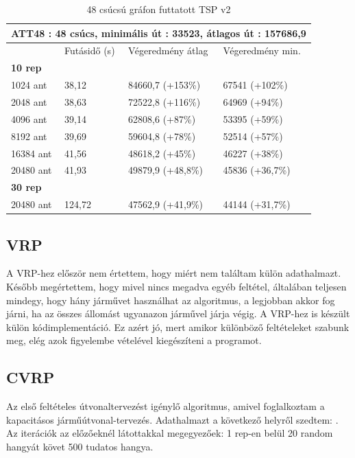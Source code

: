 \begin{table}[htbp!]
	\centering
	\begin{tabular}{|p{2cm}||p{3cm}|p{3.5cm}|p{3.5cm}|}
		\hline
		\multicolumn{4}{|c|}{ATT48 : 48 csúcs, minimális út : 33523, átlagos út : 157686,9} \\
		\hline
		& Futásidő (s) & Végeredmény átlag & Végeredmény min.\\
		\hline
		\textbf{10 rep} & & & \\
		1024 ant & 38,12 & 84660,7 (+153\%) & 67541 (+102\%) \\
		2048 ant & 38,63 & 72522,8 (+116\%) & 64969 (+94\%) \\
		4096 ant & 39,14 & 62808,6 (+87\%) & 53395 (+59\%) \\
		8192 ant & 39,69 & 59604,8 (+78\%) & 52514 (+57\%) \\
		16384 ant & 41,56 & 48618,2 (+45\%) & 46227 (+38\%)\\
		20480 ant & 41,93 & 49879,9 (+48,8\%) & 45836 (+36,7\%)\\
		\hline
		\textbf{30 rep} & & & \\
		20480 ant & 124,72 & 47562,9 (+41,9\%) & 44144 (+31,7\%) \\
		\hline
	\end{tabular}
	\caption{48 csúcsú gráfon futtatott TSP v2}
	\label{table:TSPv2_48}
\end{table}

\newpage

\subsection{VRP}
A VRP-hez először nem értettem, hogy miért nem találtam külön adathalmazt. Később megértettem, hogy mivel nincs megadva egyéb feltétel, általában teljesen mindegy, hogy hány járművet használhat az algoritmus, a legjobban akkor fog járni, ha az összes állomást ugyanazon járművel járja végig. A VRP-hez is készült külön kódimplementáció. Ez azért jó, mert amikor különböző feltételeket szabunk meg, elég azok figyelembe vételével kiegészíteni a programot.


\subsection{CVRP}
Az első feltételes útvonaltervezést igénylő algoritmus, amivel foglalkoztam a kapacitásos járműútvonal-tervezés. Adathalmazt a következő helyről szedtem: \cite{CVRPdataset}.
Az iterációk az előzőeknél látottakkal megegyezőek: 1 rep-en belül 20 random hangyát követ 500 tudatos hangya.

